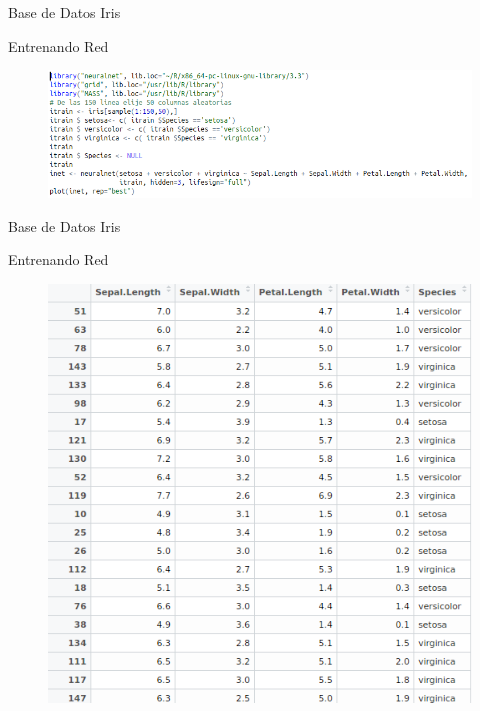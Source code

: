 \documentclass{beamer}
\begin{document}
\begin{frame}{Base de Datos Iris}
\begin{block}{Entrenando Red}
\begin{figure}
\includegraphics[scale=0.4]{entrenando.png}
\centering
\end{figure}
\end{block}
\end{frame}

\begin{frame}{Base de Datos Iris}
\begin{block}{Entrenando Red}
\begin{figure}
\includegraphics[scale=0.3]{tablairis.png}
\centering
\end{figure}
\end{block}
\end{frame}
\end{document}
